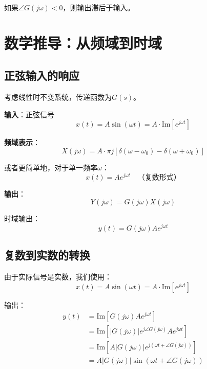\documentclass[12pt,a4paper]{article}
\begin{document}
如果$\angle G(j\omega) < 0$，则输出滞后于输入。

\section{数学推导：从频域到时域}

\subsection{正弦输入的响应}

考虑线性时不变系统，传递函数为$G(s)$。

\textbf{输入}：正弦信号
\begin{equation}
x(t) = A\sin(\omega t) = A \cdot \text{Im}[e^{j\omega t}]
\end{equation}

\textbf{频域表示}：
\begin{equation}
X(j\omega) = A \cdot \pi j [\delta(\omega - \omega_0) - \delta(\omega + \omega_0)]
\end{equation}

或者更简单地，对于单一频率$\omega$：
\begin{equation}
x(t) = A e^{j\omega t} \quad \text{（复数形式）}
\end{equation}

\textbf{输出}：
\begin{equation}
Y(j\omega) = G(j\omega) X(j\omega)
\end{equation}

时域输出：
\begin{equation}
y(t) = G(j\omega) A e^{j\omega t}
\end{equation}

\subsection{复数到实数的转换}

由于实际信号是实数，我们使用：
\begin{equation}
x(t) = A\sin(\omega t) = A \cdot \text{Im}[e^{j\omega t}]
\end{equation}

输出：
\begin{align}
y(t) &= \text{Im}[G(j\omega) A e^{j\omega t}] \\
     &= \text{Im}[|G(j\omega)| e^{j\angle G(j\omega)} A e^{j\omega t}] \\
     &= \text{Im}[A|G(j\omega)| e^{j(\omega t + \angle G(j\omega))}] \\
     &= A|G(j\omega)|\sin(\omega t + \angle G(j\omega))
\end{align}
\end{document}
